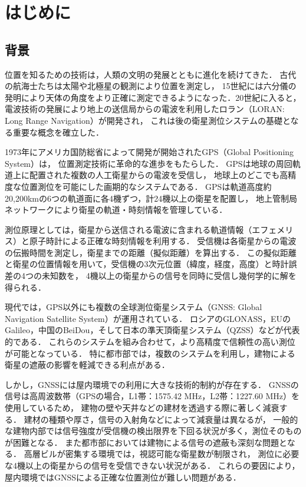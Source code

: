 \chapter{はじめに}
\thispagestyle{myheadings}


\section{背景}

位置を知るための技術は，人類の文明の発展とともに進化を続けてきた．
古代の航海士たちは太陽や北極星の観測により位置を測定し，
15世紀には六分儀の発明により天体の角度をより正確に測定できるようになった．20世紀に入ると，
電波技術の発展により地上の送信局からの電波を利用したロラン（LORAN: Long Range Navigation）が開発され，
これは後の衛星測位システムの基礎となる重要な概念を確立した．

1973年にアメリカ国防総省によって開発が開始されたGPS（Global Positioning System）は，
位置測定技術に革命的な進歩をもたらした．
GPSは地球の周回軌道上に配置された複数の人工衛星からの電波を受信し，
地球上のどこでも高精度な位置測位を可能にした画期的なシステムである．
GPSは軌道高度約20,200kmの6つの軌道面に各4機ずつ，計24機以上の衛星を配置し，
地上管制局ネットワークにより衛星の軌道・時刻情報を管理している．

測位原理としては，衛星から送信される電波に含まれる軌道情報（エフェメリス）と原子時計による正確な時刻情報を利用する．
受信機は各衛星からの電波の伝搬時間を測定し，衛星までの距離（擬似距離）を算出する．
この擬似距離と衛星の位置情報を用いて，受信機の3次元位置（緯度，経度，高度）と時計誤差の4つの未知数を，
4機以上の衛星からの信号を同時に受信し幾何学的に解を得られる．

現代では，GPS以外にも複数の全球測位衛星システム（GNSS: Global Navigation Satellite System）が運用されている．
ロシアのGLONASS，EUのGalileo，中国のBeiDou，そして日本の準天頂衛星システム（QZSS）などが代表的である．
これらのシステムを組み合わせて，より高精度で信頼性の高い測位が可能となっている．
特に都市部では，複数のシステムを利用し，建物による衛星の遮蔽の影響を軽減できる利点がある．

しかし，GNSSには屋内環境での利用に大きな技術的制約が存在する．
GNSSの信号は高周波数帯（GPSの場合，L1帯：1575.42 MHz，L2帯：1227.60 MHz）を使用しているため，
建物の壁や天井などの建材を透過する際に著しく減衰する．
建材の種類や厚さ，信号の入射角などによって減衰量は異なるが，
一般的な建物内部では信号強度が受信機の検出限界を下回る状況が多く，測位そのものが困難となる．
また都市部においては建物による信号の遮蔽も深刻な問題となる．
高層ビルが密集する環境では，視認可能な衛星数が制限され，
測位に必要な4機以上の衛星からの信号を受信できない状況がある．
これらの要因により，屋内環境ではGNSSによる正確な位置測位が難しい問題がある．

